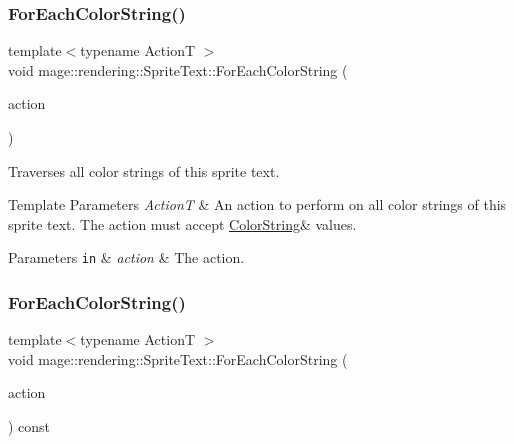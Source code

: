 \subsubsection{\texorpdfstring{For\+Each\+Color\+String()}{ForEachColorString()}\hspace{0.1cm}{\footnotesize\ttfamily [1/2]}}
{\footnotesize\ttfamily template$<$typename ActionT $>$ \\
void mage\+::rendering\+::\+Sprite\+Text\+::\+For\+Each\+Color\+String (\begin{DoxyParamCaption}\item[{ActionT}]{action }\end{DoxyParamCaption})}

Traverses all color strings of this sprite text.


\begin{DoxyTemplParams}{Template Parameters}
{\em ActionT} & An action to perform on all color strings of this sprite text. The action must accept {\ttfamily \hyperlink{classmage_1_1rendering_1_1_color_string}{Color\+String}\&} values. \\
\hline
\end{DoxyTemplParams}

\begin{DoxyParams}[1]{Parameters}
\mbox{\tt in}  & {\em action} & The action. \\
\hline
\end{DoxyParams}
\hypertarget{classmage_1_1rendering_1_1_sprite_text_af990e2c3ad1e827135b78a948c4cba50}{}\label{classmage_1_1rendering_1_1_sprite_text_af990e2c3ad1e827135b78a948c4cba50} 
\subsubsection{\texorpdfstring{For\+Each\+Color\+String()}{ForEachColorString()}\hspace{0.1cm}{\footnotesize\ttfamily [2/2]}}
{\footnotesize\ttfamily template$<$typename ActionT $>$ \\
void mage\+::rendering\+::\+Sprite\+Text\+::\+For\+Each\+Color\+String (\begin{DoxyParamCaption}\item[{ActionT}]{action }\end{DoxyParamCaption}) const}

